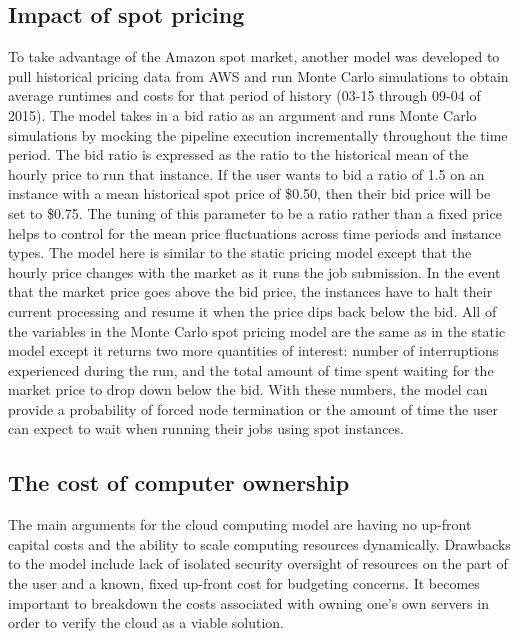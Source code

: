 \documentclass{frontiersSCNS} %
\begin{document}
\subsection{Impact of spot pricing}
To take advantage of the Amazon spot market, another model was developed to pull historical pricing data from AWS and run Monte Carlo simulations to obtain average runtimes and costs for that period of history (03-15 through 09-04 of 2015). The model takes in a bid ratio as an argument and runs Monte Carlo simulations by mocking the pipeline execution incrementally throughout the time period. The bid ratio is expressed as the ratio to the historical mean of the hourly price to run that instance. If the user wants to bid a ratio of 1.5 on an instance with a mean historical spot price of \$0.50, then their bid price will be set to \$0.75. The tuning of this parameter to be a ratio rather than a fixed price helps to control for the mean price fluctuations across time periods and instance types. The model here is similar to the static pricing model except that the hourly price changes with the market as it runs the job submission. In the event that the market price goes above the bid price, the instances have to halt their current processing and resume it when the price dips back below the bid. All of the variables in the Monte Carlo spot pricing model are the same as in the static model except it returns two more quantities of interest: number of interruptions experienced during the run, and the total amount of time spent waiting for the market price to drop down below the bid. With these numbers, the model can provide a probability of forced node termination or the amount of time the user can expect to wait when running their jobs using spot instances.

\subsection{The cost of computer ownership}
The main arguments for the cloud computing model are having no up-front capital costs and the ability to scale computing resources dynamically. Drawbacks to the model include lack of isolated security oversight of resources on the part of the user and a known, fixed up-front cost for budgeting concerns. It becomes important to breakdown the costs associated with owning one’s own servers in order to verify the cloud as a viable solution.
\end{document}
